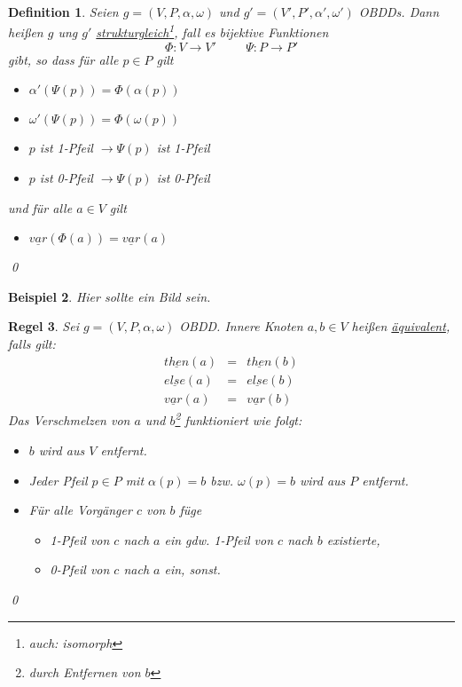 \documentclass[ngerman]{scrartcl}
\theoremstyle{custom}
\newtheorem{mdef}{Definition} \numberwithin{mdef}{subsection}
\newtheorem{mex}[mdef]{Beispiel}
\newtheorem{mr}[mdef]{Regel}
\newcommand{\0}{\mathbf{0}}
\newcommand{\1}{\mathbf{L}}
\begin{document}
\begin{mdef}
Seien $g=(V,P,\alpha,\omega)$ und $g'=(V',P',\alpha',\omega')$
OBDDs. Dann hei\ss en $g$ ung $g'$
\underline{strukturgleich}\footnote{auch: isomorph}, fall es bijektive
Funktionen 
\begin{equation*}
\Phi: V \rightarrow V' \hspace{1cm} \Psi: P \rightarrow P'
\end{equation*}
gibt, so dass f\"ur alle $p \in P$ gilt
\begin{itemize}
\item[(1)] $\alpha'(\Psi(p)) = \Phi(\alpha(p))$
\item[(2)] $\omega'(\Psi(p)) = \Phi(\omega(p))$
\item[(3)] $p$ ist 1-Pfeil $\rightarrow \Psi(p)$ ist 1-Pfeil
\item[(4)] $p$ ist 0-Pfeil $\rightarrow \Psi(p)$ ist 0-Pfeil
\end{itemize}
und f\"ur alle $a \in V$ gilt
\begin{itemize}
\item[(5)] $\underline{var}(\Phi(a)) = \underline{var}(a)$
\end{itemize}
\qed
\end{mdef}

\begin{mex}
Hier sollte ein Bild sein.
\end{mex}

\begin{mr}\label{regel:verschm}
Sei $g=(V,P,\alpha,\omega)$ OBDD. Innere Knoten $a,b \in V$ hei\ss en
\underline{\"aquivalent}, falls gilt:
\begin{eqnarray*}
\underline{then}(a) & = & \underline{then}(b)\\
\underline{else}(a) & = & \underline{else}(b)\\
\underline{var}(a) & = & \underline{var}(b)
\end{eqnarray*}
Das Verschmelzen von $a$ und $b$\footnote{durch Entfernen von $b$}
funktioniert wie folgt:
\begin{itemize}
\item[(1)] $b$ wird aus $V$ entfernt.
\item[(2)] Jeder Pfeil $p \in P$ mit $\alpha(p) = b$ bzw. $\omega(p)=b$
  wird aus $P$ entfernt.
\item[(3)] F\"ur alle Vorg\"anger $c$ von $b$ f\"uge
  \begin{itemize}
  \item[(i)] 1-Pfeil von $c$ nach $a$ ein gdw. 1-Pfeil von $c$ nach
    $b$ existierte,
  \item[(ii)] 0-Pfeil von $c$ nach $a$ ein, sonst.
  \end{itemize}
\end{itemize}
\qed
\end{mr}
\end{document}
